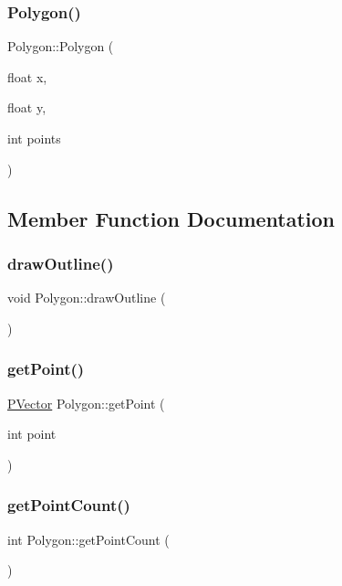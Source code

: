 \subsubsection{\texorpdfstring{Polygon()}{Polygon()}}
{\footnotesize\ttfamily Polygon\+::\+Polygon (\begin{DoxyParamCaption}\item[{float}]{x,  }\item[{float}]{y,  }\item[{int}]{points }\end{DoxyParamCaption})}



\subsection{Member Function Documentation}
\hypertarget{class_polygon_a3ae4366cd72f2414f133fab680983ea9}{}\label{class_polygon_a3ae4366cd72f2414f133fab680983ea9} 
\subsubsection{\texorpdfstring{draw\+Outline()}{drawOutline()}}
{\footnotesize\ttfamily void Polygon\+::draw\+Outline (\begin{DoxyParamCaption}{ }\end{DoxyParamCaption})}

\hypertarget{class_polygon_a5423331a39f62cf1382b9465bfa170aa}{}\label{class_polygon_a5423331a39f62cf1382b9465bfa170aa} 
\subsubsection{\texorpdfstring{get\+Point()}{getPoint()}}
{\footnotesize\ttfamily \hyperlink{struct_p_vector}{P\+Vector} Polygon\+::get\+Point (\begin{DoxyParamCaption}\item[{int}]{point }\end{DoxyParamCaption})}

\hypertarget{class_polygon_ad269b9c3f239834cd24235c73dd31bab}{}\label{class_polygon_ad269b9c3f239834cd24235c73dd31bab} 
\subsubsection{\texorpdfstring{get\+Point\+Count()}{getPointCount()}}
{\footnotesize\ttfamily int Polygon\+::get\+Point\+Count (\begin{DoxyParamCaption}{ }\end{DoxyParamCaption})}


